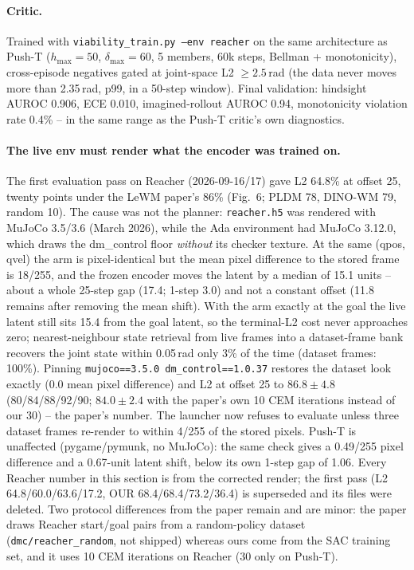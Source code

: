 \documentclass[11pt]{article}
\begin{document}
\paragraph{Critic.} Trained with \texttt{viability\_train.py --env reacher} on the same
architecture as Push-T ($h_{\max}=50$, $\delta_{\max}=60$, 5 members, 60k steps, Bellman +
monotonicity), cross-episode negatives gated at joint-space L2 $\ge 2.5$\,rad (the data never
moves more than 2.35\,rad, p99, in a 50-step window). Final validation: hindsight
AUROC 0.906, ECE 0.010, imagined-rollout AUROC 0.94, monotonicity violation rate 0.4\% --
in the same range as the Push-T critic's own diagnostics.

\paragraph{The live env must render what the encoder was trained on.} The first
evaluation pass on Reacher (2026-09-16/17) gave L2 64.8\% at offset 25, twenty points under the
LeWM paper's 86\% (Fig.~6; PLDM 78, DINO-WM 79, random 10). The cause was not the planner:
\texttt{reacher.h5} was rendered with MuJoCo 3.5/3.6 (March 2026), while the Ada environment
had MuJoCo 3.12.0, which draws the dm\_control floor \emph{without} its checker texture. At the
same (qpos, qvel) the arm is pixel-identical but the mean pixel difference to the stored frame
is 18/255, and the frozen encoder moves the latent by a median of 15.1 units -- about a whole
25-step gap (17.4; 1-step 3.0) and not a constant offset (11.8 remains after removing the mean
shift). With the arm exactly at the goal the live latent still sits 15.4 from the goal latent,
so the terminal-L2 cost never approaches zero; nearest-neighbour state retrieval from live
frames into a dataset-frame bank recovers the joint state within 0.05\,rad only 3\% of the time
(dataset frames: 100\%). Pinning \texttt{mujoco==3.5.0 dm\_control==1.0.37} restores the dataset
look exactly (0.0 mean pixel difference) and L2 at offset 25 to $86.8 \pm 4.8$ (80/84/88/92/90;
$84.0 \pm 2.4$ with the paper's own 10 CEM iterations instead of our 30) -- the paper's number.
The launcher now refuses to evaluate unless three dataset frames re-render to within 4/255 of
the stored pixels. Push-T is unaffected (pygame/pymunk, no MuJoCo): the same check gives a
0.49/255 pixel difference and a 0.67-unit latent shift, below its own 1-step gap of 1.06.
Every Reacher number in this section is from the corrected render; the first pass (L2
64.8/60.0/63.6/17.2, OUR 68.4/68.4/73.2/36.4) is superseded and its files were deleted. Two
protocol differences from the paper remain and are minor: the paper draws Reacher start/goal
pairs from a random-policy dataset (\texttt{dmc/reacher\_random}, not shipped) whereas ours come
from the SAC training set, and it uses 10 CEM iterations on Reacher (30 only on Push-T).
\end{document}

